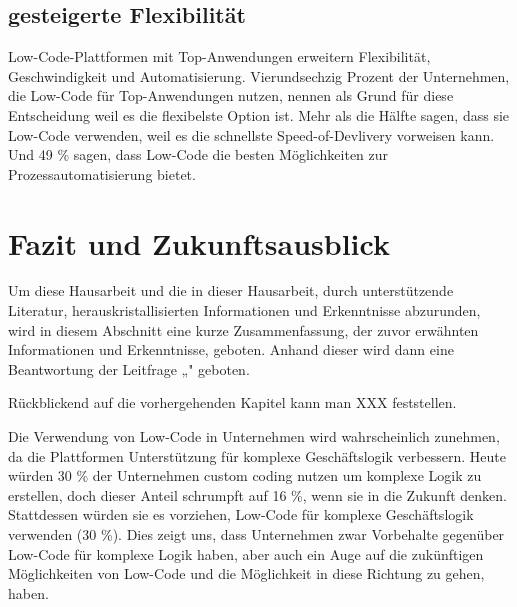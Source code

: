 \documentclass{article}
\begin{document}
	\subsection{gesteigerte Flexibilität}
	Low-Code-Plattformen mit Top-Anwendungen erweitern Flexibilität, Geschwindigkeit und Automatisierung. Vierundsechzig Prozent der Unternehmen, die Low-Code für Top-Anwendungen nutzen, nennen als Grund für diese Entscheidung weil es die flexibelste Option ist. 
	Mehr als die Hälfte sagen, dass sie Low-Code verwenden, weil es die schnellste Speed-of-Devlivery vorweisen kann. Und 49 \% sagen, dass Low-Code die besten Möglichkeiten zur Prozessautomatisierung bietet. \cite{EmmaVanPelt.2019}
	
	
	\section{Fazit und Zukunftsausblick}
	
	Um diese Hausarbeit und die in dieser Hausarbeit, durch unterstützende Literatur,
	herauskristallisierten Informationen und Erkenntnisse abzurunden, wird in diesem Abschnitt
	eine kurze Zusammenfassung, der zuvor erwähnten Informationen und Erkenntnisse,
	geboten. Anhand dieser wird dann eine Beantwortung der Leitfrage „" geboten.
	
	Rückblickend auf die vorhergehenden Kapitel kann man XXX feststellen.
	
	
	
	
	Die Verwendung von Low-Code in Unternehmen wird wahrscheinlich zunehmen, da die Plattformen
	Unterstützung für komplexe Geschäftslogik verbessern. Heute würden 30 \% der Unternehmen custom coding nutzen um komplexe Logik zu erstellen, doch dieser Anteil schrumpft auf 16 \%, wenn sie in die Zukunft denken. Stattdessen würden sie es vorziehen, Low-Code für komplexe Geschäftslogik verwenden (30 \%). Dies zeigt uns, dass Unternehmen zwar Vorbehalte gegenüber Low-Code für komplexe Logik haben, aber auch ein Auge auf die zukünftigen Möglichkeiten von Low-Code und
	die Möglichkeit in diese Richtung zu gehen, haben. \cite{EmmaVanPelt.2019}
	
	
	\newpage	
	\printbibliography[title={\section{Referenzen}}]
	
\end{document}
